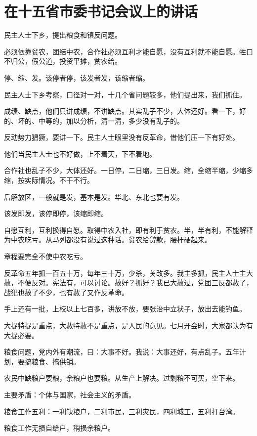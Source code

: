 \section[在十五省市委书记会议上的讲话（一九五五年）]{在十五省市委书记会议上的讲话}


民主人士下乡，提出粮食和镇反问题。

必须依靠贫农，团结中农，合作社必须互利才能自愿，没有互利就不能自愿。牲口不归公，假公道，投资平摊，贫农给。

停、缩、发。该停者停，该发者发，该缩者缩。

民主人士下乡考察，口径对一对，十几个省问题较多，他们提出来，我们抓住。

成绩、缺点，他们只讲成绩，不讲缺点。其实乱子不少，大体还好。看一下，好的、坏的、中等的，加以分析，清一清，多少没有乱子的。

反动势力猖獗，要讲一下。民主人士眼里没有反革命，借他们压一下有好处。

他们当民主人士也不好做，上不着天，下不着地。

合作社也乱子不少，大体还好。一日停，二日缩，三日发。缩，全缩半缩，少缩多缩，按实际情况。不干不行。

后解放区，一般就是发，基本是发。华北、东北也要有发。

该发即发，该停即停，该缩即缩。

自愿互利，互利换得自愿。取得中农入社，即有利于贫农。半，半有利，不能解释为中农吃亏。从马列都没有说过这种话。贫农给贷款，腰杆硬起来。

章程要完全不使中农吃亏。

反革命五年抓一百五十万，每年三十万，少杀，关改多。我主多抓，民主人士主大赦，不便反对。宪法有，可以讨论。赦好？抓好？我已大赦过，党团三反都赦了，战犯也赦了不少，也有赦了又作反革命。

手上还有一批，上校以上七百多，讲放不放，要张治中立状子，放出去能钓鱼。

大捉特捉是重点，大赦特赦不是重点，是人民的意见。七月开会时，大家都认为有大捉必要。

粮食问题，党内外有潮流，曰：大事不好。我说：大事还好，有点乱子。五年计划，要搞粮食、搞供销。

农民中缺粮户要粮，余粮户也要粮。从生产上解决。过剩粮不可买，空下来。

主要矛盾：个体与国家，社会主义的矛盾。

粮食工作五利：一利缺粮户，二利市民，三利灾民，四利城工，五利打台湾。

粮食工作无损自给户，稍损余粮户。

